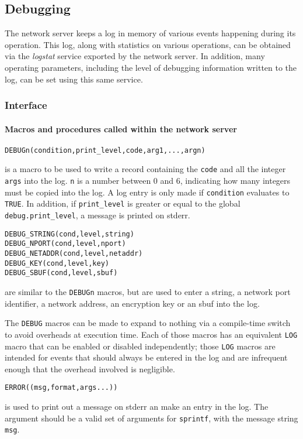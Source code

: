 \subsection{Debugging}
The network server keeps a log in memory of various events happening
during its operation. This log, along with statistics on various
operations, can be obtained via the {\it logstat} service exported by
the network server. In addition, many operating parameters, including
the level of debugging information written to the log, can be set
using this same service.

\subsubsection{Interface}
\paragraph{Macros and procedures called within the network server}
\begin{verbatim}
DEBUGn(condition,print_level,code,arg1,...,argn)
\end{verbatim}
is a macro to be used to write a record containing the \verb"code" and
all the integer \verb"args" into the log. \verb"n" is a number between
0 and 6, indicating how many integers must be copied into the log. A
log entry is only made if \verb"condition" evaluates to \verb"TRUE".
In addition, if \verb"print_level" is greater or equal to the global
\verb"debug.print_level", a message is printed on stderr.

\begin{verbatim}
DEBUG_STRING(cond,level,string)
DEBUG_NPORT(cond,level,nport)
DEBUG_NETADDR(cond,level,netaddr)
DEBUG_KEY(cond,level,key)
DEBUG_SBUF(cond,level,sbuf)
\end{verbatim}
are similar to the \verb"DEBUGn" macros, but are used to enter a
string, a network port identifier, a network address, an encryption
key or an sbuf into the log.

The \verb"DEBUG" macros can be made to expand to nothing via a
compile-time switch to avoid overheads at execution time. Each of
those macros has an equivalent \verb"LOG" macro that can be enabled or
disabled independently; those \verb"LOG" macros are intended for
events that should always be entered in the log and are infrequent
enough that the overhead involved is negligible.

\begin{verbatim}
ERROR((msg,format,args...))
\end{verbatim}
is used to print out a message on stderr an make an entry in the log.
The argument should be a valid set of arguments for \verb"sprintf",
with the message string \verb"msg".

